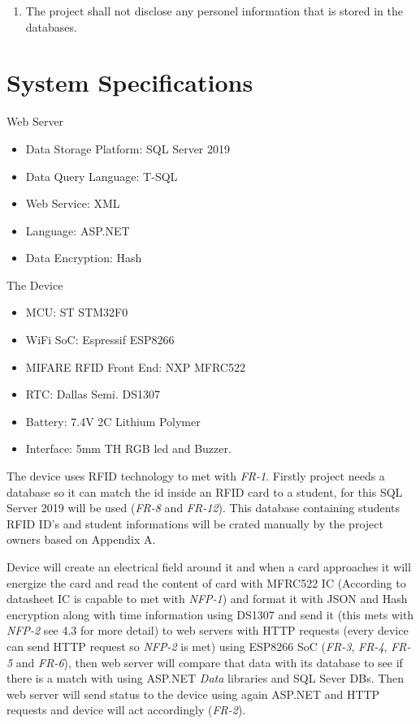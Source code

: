 \documentclass{scrreprt}
\begin{document}
\begin{enumerate}[leftmargin=5\parindent, label=NFE-\arabic*:]

\item  The project shall not disclose any personel information that is stored in the databases.

\end{enumerate}

\section{System Specifications }

Web Server
\begin{itemize}

\item  Data Storage Platform: SQL Server 2019
\item  Data Query Language:  T-SQL
\item  Web Service: XML
\item  Language: ASP.NET
\item  Data Encryption: Hash

\end{itemize}

\vspace{3mm}
The Device
\begin{itemize}

\item  MCU: ST STM32F0
\item  WiFi SoC: Espressif ESP8266
\item  MIFARE RFID Front End: NXP MFRC522 
\item  RTC: Dallas Semi. DS1307  
\item  Battery: 7.4V 2C Lithium Polymer
\item Interface: 5mm TH RGB led and Buzzer.

\end{itemize}

\vspace{3mm}

The device uses RFID technology to met with \textit{FR-1}. Firstly project needs a database so it can match the id inside an RFID card to a student, for this SQL Server 2019 will be used (\textit{FR-8} and \textit{FR-12}). This database containing students RFID ID's and student informations will be crated manually by the project owners based on Appendix A.

Device will create an electrical field around it and when a card approaches it will energize the card and read the content of card with MFRC522 IC (According to datasheet IC is capable to met with \textit{NFP-1})   and format it with JSON and Hash encryption along with time information using DS1307 and send it (this mets with \textit{NFP-2} see 4.3 for more detail)  to web servers with HTTP requests (every device can send HTTP request so \textit{NFP-2} is met) using ESP8266 SoC (\textit{FR-3}, \textit{FR-4}, \textit{FR-5} and \textit{FR-6}), then web server will compare that data with its database to see if there is a match with using ASP.NET \textit{Data} libraries and SQL Sever DBs. Then web server will send status to the device using again ASP.NET and HTTP requests and device will act accordingly (\textit{FR-2}). 
\end{document}
